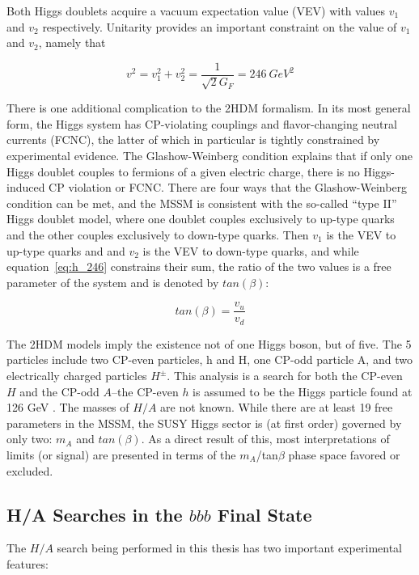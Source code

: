 

Both Higgs doublets acquire a vacuum expectation value (VEV) with values $v_1$ and $v_2$ respectively.  Unitarity provides an important constraint on the value of $v_1$ and $v_2$, namely that 

\begin{equation}
	v^2 = v_1^2 + v_2^2 = \frac{1}{\sqrt{2}G_F} = 246\ GeV^2
	\label{eq:h_246}
\end{equation}


There is one additional complication to the 2HDM formalism.  In its most general form, the Higgs system has CP-violating couplings and flavor-changing neutral currents (FCNC), the latter of which in particular is tightly constrained by experimental evidence.  The Glashow-Weinberg condition explains that if only one Higgs doublet couples to fermions of a given electric charge, there is no Higgs-induced CP violation or FCNC.  There are four ways that the Glashow-Weinberg condition can be met, and the MSSM is consistent with the so-called ``type II'' Higgs doublet model, where one doublet couples exclusively to up-type quarks and the other couples exclusively to down-type quarks.  Then $v_1$ is the VEV to up-type quarks and and $v_2$ is the VEV to down-type quarks, and while equation~\ref{eq:h_246} constrains their sum, the ratio of the two values is a free parameter of the system and is denoted by $tan(\beta)$:

\begin{equation}
	tan(\beta) = \frac{v_u}{v_d}
\end{equation}




The 2HDM models imply the existence not of one Higgs boson, but of five.  The 5 particles include two CP-even particles, h and H, one CP-odd particle A, and two electrically charged particles $H^\pm$.   This analysis is a search for both the CP-even $H$ and the CP-odd $A$--the CP-even $h$ is assumed to be the Higgs particle found at 126 GeV \cite{PDG-Review}.  The masses of $H/A$ are not known.  While there are at least 19 free parameters in the MSSM, the SUSY Higgs sector is (at first order) governed by only two: $m_A$ and $tan(\beta)$.  As a direct result of this, most interpretations of limits (or signal) are presented in terms of the $m_A$/tan$\beta$ phase space favored or excluded.  


\subsection{H/A Searches in the $bbb$ Final State}
The $H/A$ search being performed in this thesis has two important experimental features:

